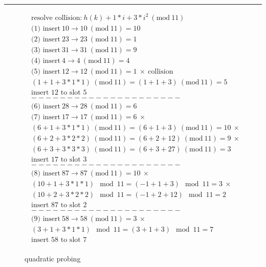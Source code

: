 \documentclass[a4paper]{article}
\newcommand{\Mod}[1]{\ (\mathrm{mod}\ #1)}
\begin{document}
\par\noindent\rule{\textwidth}{0.4pt}
\begin{minipage}{8cm}
\begin{align*}
  &\text{resolve collision:}\ h(k) + 1 * i + 3* i^2\Mod{11}\\
  &\text{(1) insert}\ 10 \to 10 \Mod{11} = 10\\
  &\text{(2) insert}\ 23 \to 23 \Mod{11} = 1\\
  &\text{(3) insert}\ 31 \to 31 \Mod{11} = 9\\
  &\text{(4) insert}\ 4 \to 4 \Mod{11} = 4\\
  &\text{(5) insert}\ 12 \to  12 \Mod{11} = 1\ \times\ \text{collision} \\
  &(1 + 1 + 3 * 1 * 1) \Mod{11} = (1 + 1 + 3) \Mod{11} = 5\\
  &\text{insert $12$ to slot $5$}\\
  &---------------------\\
  &\text{(6) insert}\ 28\to 28\Mod{11} = 6\\
  &\text{(7) insert}\ 17\to 17\Mod{11} = 6\ \times \\
  &(6 + 1 + 3 * 1 * 1) \Mod{11} = (6 + 1 + 3) \Mod{11} = 10\ \times \\
  &(6 + 2 + 3 * 2 * 2) \Mod{11} = (6 + 2 + 12) \Mod{11} = 9\ \times \\
  &(6 + 3 + 3 * 3 * 3) \Mod{11} = (6 + 3 + 27) \Mod{11} = 3 \\
  &\text{insert $17$ to slot $3$}\\
  &---------------------\\
  &\text{(8) insert}\ 87\to 87\Mod{11} = 10\ \times\\
  &(10 + 1 + 3 * 1 * 1) \mod{11} = (-1 + 1 + 3) \mod{11} = 3\ \times \\
  &(10 + 2 + 3 * 2 * 2) \mod{11} = (-1 + 2 + 12) \mod{11} = 2 \\
  &\text{insert $87$ to slot $2$}\\
  &---------------------\\
  &\text{(9) insert}\ 58\to 58\Mod{11} = 3\ \times\\
  &(3 + 1 + 3 * 1 * 1) \mod{11} = (3 + 1 + 3) \mod{11} = 7\\
  &\text{insert $58$ to slot $7$}\\
\end{align*}
\end{minipage}
\qquad
\begin{minipage}{5cm}
\begin{figure}[H]
\centering
\caption{quadratic probing}
\end{figure}
\end{minipage}
\end{document}
